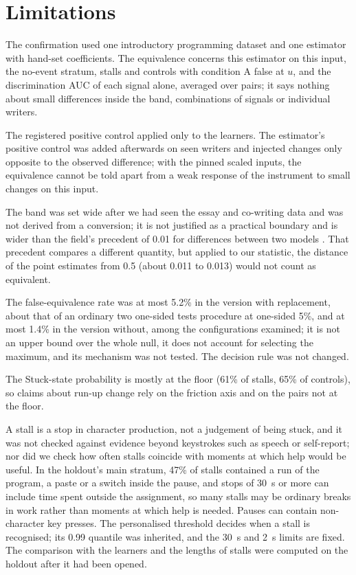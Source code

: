 \section{Limitations}
\label{sec:limitations}

The confirmation used one introductory programming dataset and one estimator with hand-set coefficients. The
equivalence concerns this estimator on this input, the no-event stratum, stalls and controls with condition A false at
$u$, and the discrimination AUC of each signal alone, averaged over pairs; it says nothing about small differences inside
the band, combinations of signals or individual writers.

The registered positive control applied only to the learners. The estimator's positive control was added afterwards on
seen writers and injected changes only opposite to the observed difference; with the pinned scaled inputs, the
equivalence cannot be told apart from a weak response of the instrument to small changes on this input.

The band was set wide after we had seen the essay and co-writing data and was not derived from a conversion;
it is not justified as a practical boundary and is wider than the field's precedent of 0.01 for differences between two
models \cite{gardner2018evaluating}. That precedent compares a different quantity, but applied to our statistic, the
distance of the point estimates from 0.5 (about 0.011 to 0.013) would not count as equivalent.

The false-equivalence rate was at most 5.2\% in
the version with replacement, about that of an ordinary two one-sided tests procedure at one-sided 5\%, and at most 1.4\%
in the version without, among the configurations examined; it is not an
upper bound over the whole null, it does not account for selecting the maximum, and its mechanism was not tested.  The decision rule was not changed.

The Stuck-state probability is mostly at the floor (61\% of stalls, 65\% of controls), so claims about run-up change
rely on the friction axis and on the pairs not at the floor.

A stall is a stop in character production, not a judgement of being stuck, and it was not checked against evidence
beyond keystrokes such as speech or self-report; nor did we check how often stalls coincide with moments at which help
would be useful. In the holdout's main stratum, 47\% of stalls contained a run of the program, a paste or a switch
inside the pause, and stops of 30~s or more can include time spent outside the assignment, so many stalls may be ordinary
breaks in work rather than moments at which help is needed. Pauses can contain non-character key presses. The personalised threshold decides when a stall is
recognised; its 0.99 quantile was inherited, and the 30~s and 2~s limits are fixed. The comparison with the learners and
the lengths of stalls were computed on the holdout after it had been opened.

